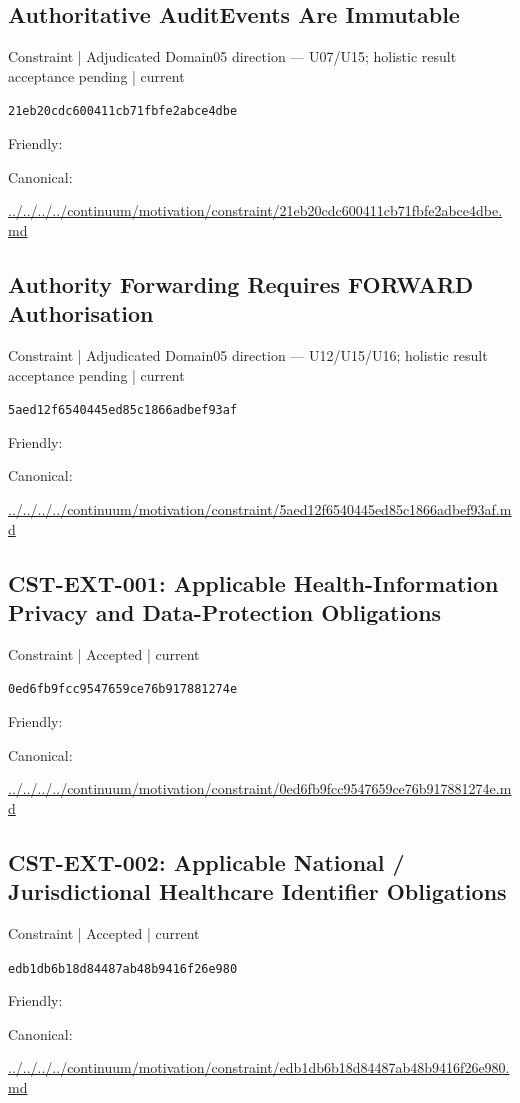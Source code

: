 \documentclass[10pt,a4paper]{article}
\begin{document}
\subsection*{Authoritative AuditEvents Are Immutable}
{\small Constraint | Adjudicated Domain05 direction — U07/U15; holistic result acceptance pending | current}\par
\texttt{21eb20cdc600411cb71fbfe2abce4dbe}\par
Friendly: \par
Canonical: \par
{\footnotesize\url{../../../../continuum/motivation/constraint/21eb20cdc600411cb71fbfe2abce4dbe.md}}\par
\subsection*{Authority Forwarding Requires FORWARD Authorisation}
{\small Constraint | Adjudicated Domain05 direction — U12/U15/U16; holistic result acceptance pending | current}\par
\texttt{5aed12f6540445ed85c1866adbef93af}\par
Friendly: \par
Canonical: \par
{\footnotesize\url{../../../../continuum/motivation/constraint/5aed12f6540445ed85c1866adbef93af.md}}\par
\subsection*{CST-EXT-001: Applicable Health-Information Privacy and Data-Protection Obligations}
{\small Constraint | Accepted | current}\par
\texttt{0ed6fb9fcc9547659ce76b917881274e}\par
Friendly: \par
Canonical: \par
{\footnotesize\url{../../../../continuum/motivation/constraint/0ed6fb9fcc9547659ce76b917881274e.md}}\par
\subsection*{CST-EXT-002: Applicable National / Jurisdictional Healthcare Identifier Obligations}
{\small Constraint | Accepted | current}\par
\texttt{edb1db6b18d84487ab48b9416f26e980}\par
Friendly: \par
Canonical: \par
{\footnotesize\url{../../../../continuum/motivation/constraint/edb1db6b18d84487ab48b9416f26e980.md}}\par
\end{document}
